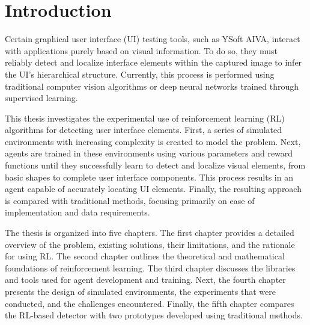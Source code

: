 \documentclass[
  digital,     %
  oneside,     %
  nosansbold,  %
  nocolorbold, %
  lof,         %
  lot,         %
]{fithesis4}
\begin{document}
\chapter*{Introduction}

Certain graphical user interface (UI) testing tools, such as YSoft AIVA, interact with applications purely based on visual information. To do so, they must reliably detect and localize interface elements within the captured image to infer the UI's hierarchical structure. Currently, this process is performed using traditional computer vision algorithms or deep neural networks trained through supervised learning.

This thesis investigates the experimental use of reinforcement learning (RL) algorithms for detecting user interface elements. First, a series of simulated environments with increasing complexity is created to model the problem. Next, agents are trained in these environments using various parameters and reward functions until they successfully learn to detect and localize visual elements, from basic shapes to complete user interface components. This process results in an agent capable of accurately locating UI elements. Finally, the resulting approach is compared with traditional methods, focusing primarily on ease of implementation and data requirements.

The thesis is organized into five chapters. The first chapter provides a detailed overview of the problem, existing solutions, their limitations, and the rationale for using RL. The second chapter outlines the theoretical and mathematical foundations of reinforcement learning. The third chapter discusses the libraries and tools used for agent development and training. Next, the fourth chapter presents the design of simulated environments, the experiments that were conducted, and the challenges encountered. Finally, the fifth chapter compares the RL-based detector with two prototypes developed using traditional methods.
\end{document}
